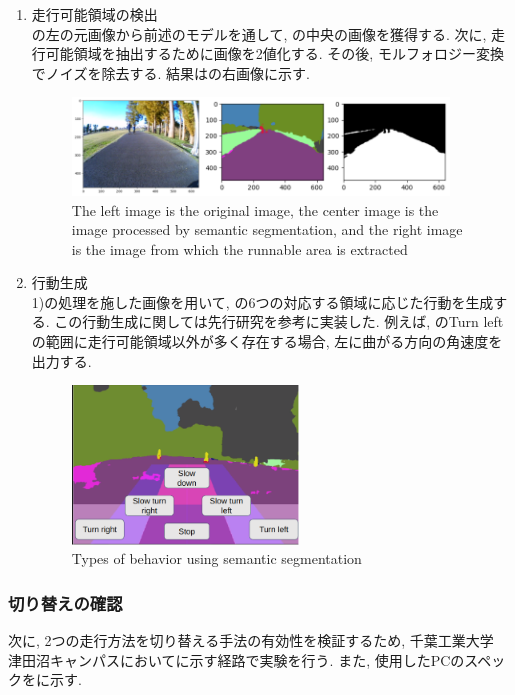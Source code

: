 \documentclass[uplatex, twocolumn, 9pt]{jsproceedings}
\begin{document}
  \newpage
  \begin{enumerate}
    \item 走行可能領域の検出\\
  の左の元画像から前述のモデルを通して, の中央の画像を獲得する. 次に, 走行可能領域を抽出するために画像を2値化する. その後, モルフォロジー変換\cite{morphological}でノイズを除去する. 結果はの右画像に示す.
  \begin{figure}[h]
    \centering
    \includegraphics[width=100mm]{fig/tsukuba-seg.pdf}
    \caption{The left image is the original image, the center image is the image processed by semantic segmentation, and the right image is the image from which the runnable area is extracted}
    \label{fig:seg_runarea}%
  \end{figure}
  \item 行動生成\\
  1)の処理を施した画像を用いて, の6つの対応する領域に応じた行動を生成する. この行動生成に関しては先行研究\cite{meiji-thesis}を参考に実装した. 例えば, のTurn leftの範囲に走行可能領域以外が多く存在する場合, 左に曲がる方向の角速度を出力する. 
  \begin{figure}[h]
    \centering
    \includegraphics[width=60mm]{fig/seg.pdf}
    \caption{Types of behavior using semantic segmentation}
    \label{fig:seg}%
  \end{figure}
\end{enumerate}

\subsubsection{切り替えの確認}
次に, 2つの走行方法を切り替える手法の有効性を検証するため, 千葉工業大学 津田沼キャンパスにおいてに示す経路で実験を行う. また, 使用したPCのスペックをに示す. 
\end{document}

